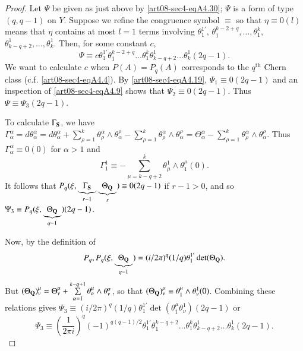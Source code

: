 \begin{proof}
Let $\Psi$ be given as just above by \eqref{art08-sec4-eqA4.30}; $\Psi$ is a form of type $(q,q-1)$ on $Y$. Suppose we refine the congruence symbol $\equiv$ so that $\eta\equiv 0(l)$ means that $\eta$ contains at most $l=1$ terms involving $\theta^{1'}_{1}$, $\theta^{k-2+q}_{1},\ldots,\theta^{k}_{1}$, $\theta^{1}_{k-q+2},\ldots,\theta^{1}_{k}$. Then, for some constant $c$,
\begin{equation*}
\Psi \equiv c\theta^{1'}_{1}\theta^{k-2+q}_{1}\ldots\theta^{k}_{1}\theta^{1}_{k-q+2}\ldots\theta^{1}_{k}(2q-1).\tag{A4.31}\label{art08-sec4-eqA4.31}
\end{equation*}
We want to calculate $c$ when $P(A)=P_{q}(A)$ corresponds to the $q^{\text{th}}$ Chern class (c.f. \eqref{art08-sec4-eqA4.4}). By \eqref{art08-sec4-eqA4.19}, $\Psi_{1}\equiv 0(2q-1)$ and an inspection of \eqref{art08-sec4-eqA4.9} shows that $\Psi_{2}\equiv 0(2q-1)$. Thus $\Psi\equiv \Psi_{3}(2q-1)$.

To calculate $\Gamma_{\mathbf{S}}$, we have $\Gamma^{\alpha}_{\alpha}=d\theta^{\alpha}_{\alpha}=d\theta^{\alpha}_{\alpha}+\sum\limits^{k}_{\rho=1}\theta^{\alpha}_{\rho}\wedge \theta^{\rho}_{\alpha}-\sum\limits^{k}_{\rho=1}\theta^{\alpha}_{\rho}\wedge \theta^{\rho}_{\alpha}=\Theta^{\alpha}_{\alpha}-\sum\limits^{k}_{\rho=1}\theta^{\alpha}_{\rho}\wedge \theta^{\rho}_{\alpha}$. Thus $\Gamma^{\alpha}_{\alpha}\equiv 0(0)$ for $\alpha>1$ and 
$$
\Gamma^{1}_{1}\equiv -\sum\limits^{k}_{\mu=k-q+2}\theta^{1}_{\mu}\wedge \theta^{\mu}_{1}(0).
$$\pageoriginale
It follows that $P_{q}(\xi,\underbrace{\Gamma_{\mathbf{S}}}_{r-1}\underbrace{\Theta_{\mathbf{Q}}}_{s})\equiv 0(2q-1)$ if $r-1>0$, and so $\Psi_{3}\equiv P_{q}(\xi, \underbrace{\Theta_{\mathbf{Q}}}_{q-1})(2q-1)$.

Now, by the definition of 
$$
P_{q}, P_{q}(\xi,\underbrace{\Theta_{\mathbf{Q}}}_{q-1})=(i/2\pi)^{q}(1/q)\theta^{1'}_{1}\det(\Theta_{\mathbf{Q}}).
$$ 
But $(\Theta_{\mathbf{Q}})^{\mu}_{\nu}=\Theta^{\mu}_{\nu}+\sum\limits^{k-q+1}_{\alpha=1}\theta^{\mu}_{\alpha}\wedge \theta^{\alpha}_{\nu}$, so that $(\Theta_{\mathbf{Q}})^{\mu}_{\nu}\equiv \theta^{\mu}_{1}\wedge\theta^{1}_{\nu}(0)$. Combining these relations gives $\Psi_{3}\equiv (i/2\pi)^{q}(1/q)\theta^{1'}_{1}\det (\theta^{\mu}_{1}\theta^{1}_{\nu})(2q-1)$ or 
\begin{equation*}
\Psi_{3}\equiv \left(\frac{1}{2\pi i}\right)^{q}(-1)^{q(q-1)/2}\theta^{1'}_{1}\theta^{k-q+2}_{1}\ldots\theta^{k}_{1}\theta^{1}_{k-q+2}\ldots\theta^{1}_{k}(2q-1).\tag{A4.32}\label{art08-sec4-eqA4.32}
\end{equation*}


\end{proof}

